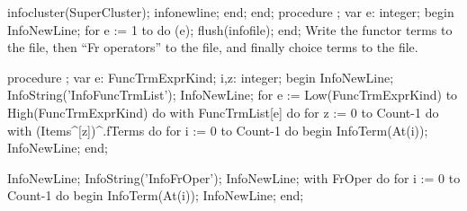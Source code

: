          infocluster(SuperCluster);
         infonewline;
      end;
end;
\eatline
{}\nwendcode{}\nwdocspar
\nwenddocs{}\endmoddef\nwstartdeflinemarkup\nwenddeflinemarkup
procedure ;
var
   e: integer;
begin
   InfoNewLine;
   for e := 1 to  do (e);
   flush(infofile);
end;
\eatline
{}\nwendcode{}\nwdocspar
Write the functor terms to the file, then ``Fr operators'' to the file,
and finally choice terms to the file.

\nwenddocs{}\endmoddef\nwstartdeflinemarkup\nwenddeflinemarkup
procedure ;
var
   e: FuncTrmExprKind;
   i,z: integer;
begin
   InfoNewLine;
   InfoString('InfoFuncTrmList');
   InfoNewLine;
   for e := Low(FuncTrmExprKind) to High(FuncTrmExprKind) do
      with FuncTrmList[e] do
         for z := 0 to Count-1 do
            with (Items^[z])^.fTerms do
               for i := 0 to Count-1 do
               begin
                  InfoTerm(At(i)); 
                  InfoNewLine;
               end;
   
   InfoNewLine;
   InfoString('InfoFrOper');
   InfoNewLine;
   with FrOper do
      for i := 0 to Count-1 do
      begin
         InfoTerm(At(i));
         InfoNewLine;
      end;
   
